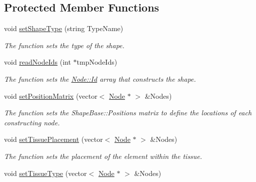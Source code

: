 \subsection*{Protected Member Functions}
\begin{DoxyCompactItemize}
\item 
void \hyperlink{classShapeBase_a740a379f345d7d8046309313b6903950}{set\+Shape\+Type} (string Type\+Name)
\begin{DoxyCompactList}\small\item\em The function sets the type of the shape. \end{DoxyCompactList}\item 
void \hyperlink{classShapeBase_a04859ea938c88369d48fa4e27bcd73f6}{read\+Node\+Ids} (int $\ast$tmp\+Node\+Ids)
\begin{DoxyCompactList}\small\item\em The function sets the \hyperlink{classNode_a1bd379569cc1a8b96432e61971aed4d9}{Node\+::\+Id} array that constructs the shape. \end{DoxyCompactList}\item 
void \hyperlink{classShapeBase_a93c774ad8de4f6ed3e70d98add1744b1}{set\+Position\+Matrix} (vector$<$ \hyperlink{classNode}{Node} $\ast$ $>$ \&Nodes)
\begin{DoxyCompactList}\small\item\em The function sets the Shape\+Base\+::\+Positions matrix to define the locations of each constructing node. \end{DoxyCompactList}\item 
void \hyperlink{classShapeBase_abbffef73b01ff9d09f707c2aba28a1a1}{set\+Tissue\+Placement} (vector$<$ \hyperlink{classNode}{Node} $\ast$ $>$ \&Nodes)
\begin{DoxyCompactList}\small\item\em The function sets the placement of the element within the tissue. \end{DoxyCompactList}\item 
\hypertarget{classShapeBase_a79d7d67d8b94081ea40c05c1c04a133a}{}void \hyperlink{classShapeBase_a79d7d67d8b94081ea40c05c1c04a133a}{set\+Tissue\+Type} (vector$<$ \hyperlink{classNode}{Node} $\ast$ $>$ \&Nodes)\label{classShapeBase_a79d7d67d8b94081ea40c05c1c04a133a}


\end{DoxyCompactItemize}
